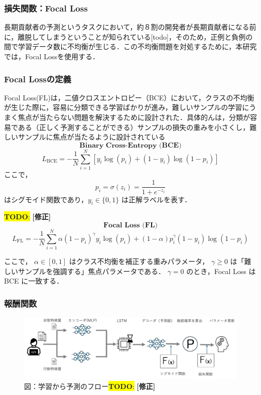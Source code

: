 \documentclass[submit,techrep,noauthor]{ipsj}
\newcommand{\todo}[1]{\colorbox{yellow}{{\bf TODO}:}{\color{red} {\textbf{[#1]}}}}
\begin{document}
\subsubsection{損失関数：Focal Loss}
長期貢献者の予測というタスクにおいて，約８割の開発者が長期貢献者になる前に，離脱してしまうということが知られている[todo]，そのため，正例と負例の間で学習データ数に不均衡が生じる．この不均衡問題を対処するために，本研究では，Focal Lossを使用する．
\subsubsection{Focal Lossの定義}
Focal Loss(FL)は，二値クロスエントロピー（BCE）において，クラスの不均衡が生じた際に，容易に分類できる学習ばかりが進み，難しいサンプルの学習にうまく焦点が当たらない問題を解決するために設計された．具体的んは，分類が容易である（正しく予測することができる）サンプルの損失の重みを小さくし，難しいサンプルに焦点が当たるように設計されている
\[\textbf{Binary Cross-Entropy (BCE)}\]
\[
L_{\mathrm{BCE}} = - \frac{1}{N} \sum_{i=1}^{N} \left[ y_i\log(p_i) + (1 - y_i)\log(1 - p_i)\right]
\]
ここで，
\[p_i = \sigma(z_i) = \frac{1}{1 + e^{-z_i}}\]はシグモイド関数であり，\(y_i \in \{0,1\}\) は正解ラベルを表す．

\todo{修正}
\[\textbf{Focal Loss (FL)}\]
\[
L_{\mathrm{FL}} = - \frac{1}{N} \sum_{i=1}^{N} \alpha (1 - p_i)^{\gamma} y_i \log(p_i) + (1 - \alpha) p_i^{\gamma} (1 - y_i) \log(1 - p_i)
\]

ここで，
\(\alpha \in [0,1]\) はクラス不均衡を補正する重みパラメータ，  
\(\gamma \ge 0\) は「難しいサンプルを強調する」焦点パラメータである．  
\(\gamma = 0\) のとき，Focal Loss は BCE に一致する．


\subsubsection{報酬関数}
\begin{figure}[t]
    \centering
    \includegraphics[width = 1.0\textwidth]{./Hashimoto_fig/prediction.pdf}
    \caption{図：学習から予測のフロー\todo{修正}}
    \label{fig:RL}
\end{figure}
\end{document}
